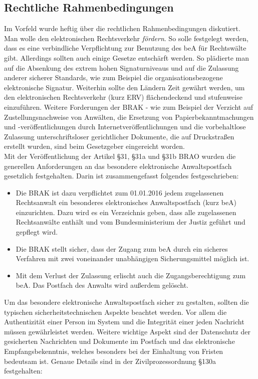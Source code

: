\subsection{Rechtliche Rahmenbedingungen}
Im Vorfeld wurde heftig über die rechtlichen Rahmenbedingungen diskutiert. Man wolle den elektronischen Rechtsverkehr \textit{fördern}. So solle festgelegt werden, dass es eine verbindliche Verpflichtung zur Benutzung des beA für Rechtswälte gibt. Allerdings sollten auch einige Gesetze entschärft werden. So plädierte man auf die Absenkung des extrem hohen Signaturniveaus und auf die Zulassung anderer sicherer Standards, wie zum Beispiel die organisationsbezogene elektronische Signatur. Weiterhin sollte den Ländern Zeit gewährt werden, um den elektronischen Rechtsverkehr (kurz ERV) flächendeckend und stufenweise einzuführen. Weitere Forderungen der BRAK - wie zum Beispiel der Verzicht auf Zustellungsnachweise von Anwälten, die Ersetzung von Papierbekanntmachungen und -veröffentlichungen durch Internetveröffentlichungen und die vorbehaltlose Zulassung unterschriftsloser gerichtlicher Dokumente, die auf Druckstraßen erstellt wurden, sind beim Gesetzgeber eingereicht worden. \\
Mit der Veröffentlichung der Artikel §31, §31a und §31b BRAO \cite{bea:bea:brao31} wurden die generellen Anforderungen an das besondere elektronische Anwaltspostfach gesetzlich festgehalten. Darin ist zusammengefasst folgendes festgeschrieben:
\begin{itemize}
	\item Die BRAK ist dazu verpflichtet zum 01.01.2016 jedem zugelassenen Rechtsanwalt ein besonderes elektronisches Anwaltspostfach (kurz beA) einzurichten. Dazu wird es ein Verzeichnis geben, dass alle zugelassenen Rechtsanwälte enthält und vom Bundesministerium der Justiz geführt und gepflegt wird.
	\item Die BRAK stellt sicher, dass der Zugang zum beA durch ein sicheres Verfahren mit zwei voneinander unabhängigen Sicherungsmittel möglich ist.
	\item Mit dem Verlust der Zulassung erlischt auch die Zugangsberechtigung zum beA. Das Postfach des Anwalts wird außerdem gelöscht.
\end{itemize}

Um das besondere elektronische Anwaltspostfach sicher zu gestalten, sollten die typischen sicherheitstechnischen Aspekte beachtet werden. Vor allem die Authentizität einer Person im System und die Integrität einer jeden Nachricht müssen gewährleistet werden. Weitere wichtige Aspekt sind der Datenschutz der gesicherten Nachrichten und Dokumente im Postfach und das elektronische Empfangsbekenntnis, welches besonders bei der Einhaltung von Fristen bedeutsam ist. Genaue Details sind in der Zivilprozessordnung §130a \cite{bea:bea:zpo130} festgehalten:

